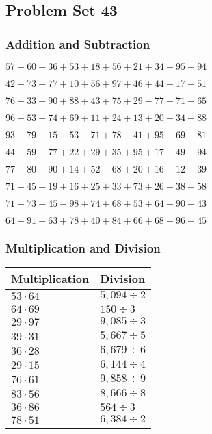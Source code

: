 \hypertarget{problem-set-43}{%
\subsection{Problem Set 43}\label{problem-set-43}}

\hypertarget{addition-and-subtraction}{%
\subsubsection{Addition and
Subtraction}\label{addition-and-subtraction}}

\(57+60+36+53+18+56+21+34+95+94\)

\(42+73+77+10+56+97+46+44+17+51\)

\(76-33+90+88+43+75+29-77-71+65\)

\(96+53+74+69+11+24+13+20+34+88\)

\(93+79+15-53-71+78-41+95+69+81\)

\(44+59+77+22+29+35+95+17+49+94\)

\(77+80-90+14+52-68+20+16-12+39\)

\(71+45+19+16+25+33+73+26+38+58\)

\(71+73+45-98+74+68+53+64-90-43\)

\(64+91+63+78+40+84+66+68+96+45\)

\hypertarget{multiplication-and-division}{%
\subsubsection{Multiplication and
Division}\label{multiplication-and-division}}

\begin{longtable}[]{@{}ll@{}}
\toprule
Multiplication & Division\tabularnewline
\midrule
\endhead
\(53\cdot64\) & \(5,094÷2\)\tabularnewline
\(64\cdot69\) & \(150÷3\)\tabularnewline
\(29\cdot97\) & \(9,085÷3\)\tabularnewline
\(39\cdot31\) & \(5,667÷5\)\tabularnewline
\(36\cdot28\) & \(6,679÷6\)\tabularnewline
\(29\cdot15\) & \(6,144÷4\)\tabularnewline
\(76\cdot61\) & \(9,858÷9\)\tabularnewline
\(83\cdot56\) & \(8,666÷8\)\tabularnewline
\(36\cdot86\) & \(564÷3\)\tabularnewline
\(78\cdot51\) & \(6,384÷2\)\tabularnewline
\bottomrule
\end{longtable}
